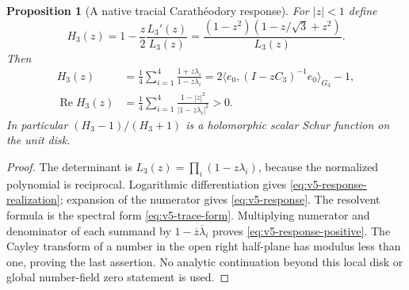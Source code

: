 \documentclass[11pt]{article}
\newtheorem{proposition}[proposition]{Proposition}
\theoremstyle{definition}
\theoremstyle{remark}
\newcommand{\ip}[2]{\langle#1,#2\rangle}
\begin{document}
\begin{proposition}[A native tracial Carath\'eodory response]
\label{prop:v5-response}
For $|z|<1$ define
\begin{equation}
 \boxed{
 H_3(z)=1-\frac z2\frac{L_3'(z)}{L_3(z)}
 =\frac{(1-z^2)(1-z/\sqrt3+z^2)}{L_3(z)}.}
 \label{eq:v5-response}
\end{equation}
Then
\begin{align}
 H_3(z)&=\frac14\sum_{i=1}^4\frac{1+z\lambda_i}{1-z\lambda_i}
 =2\ip{e_0}{(I-zC_3)^{-1}e_0}_{G_3}-1,\label{eq:v5-response-realization}\\
 \operatorname{Re}H_3(z)&=\frac14\sum_{i=1}^4
          \frac{1-|z|^2}{|1-z\lambda_i|^2}>0.\label{eq:v5-response-positive}
\end{align}
In particular $(H_3-1)/(H_3+1)$ is a holomorphic scalar Schur function
on the unit disk.
\end{proposition}
\begin{proof}
The determinant is $L_3(z)=\prod_i(1-z\lambda_i)$, because the
normalized polynomial is reciprocal. Logarithmic differentiation gives
\eqref{eq:v5-response-realization}; expansion of the numerator gives
\eqref{eq:v5-response}. The resolvent formula is the spectral form
\eqref{eq:v5-trace-form}. Multiplying numerator and denominator of each
summand by $1-\overline z\overline\lambda_i$ proves
\eqref{eq:v5-response-positive}. The Cayley transform of a number in
the open right half-plane has modulus less than one, proving the last
assertion. No analytic continuation beyond this local disk or global
number-field zero statement is used.
\end{proof}
\end{document}
